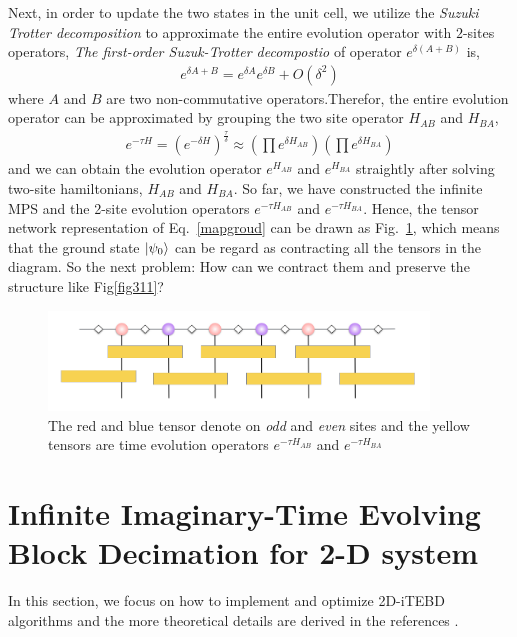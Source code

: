 Next, in order to update the two states in the unit cell, we utilize the \textit{Suzuki Trotter decomposition} to approximate the entire evolution operator with $2$-sites operators, \textit{The first-order Suzuk-Trotter decompostio} of operator $e^{\delta (A+B)}$ is,
\begin{align}
	\label{STd}
	e^{\delta A + B} = e^{\delta A}e^{\delta B} + O(\delta^2)
\end{align}
where $A$ and $B$ are two non-commutative operators.Therefor, the entire evolution operator can be approximated by grouping the two site operator $H_{AB}$ and $H_{BA}$,
\begin{align}
	\label{evoopt}
	e^{-\tau H} = \left(e^{-\delta H}\right)^{\frac{\tau}{\delta}} \approx \left(\prod e^{\delta H_{AB}} \right)\left( \prod e^{\delta H_{BA}}\right)
\end{align}
and we can obtain the evolution operator $e^{H_{AB}}$ and $e^{H_{BA}}$ straightly after solving two-site hamiltonians, $H_{AB}$ and $H_{BA}$.
So far, we have constructed the infinite MPS and the 2-site evolution operators $e^{-\tau H_{AB}}$ and $e^{-\tau H_{BA}}$. Hence, the tensor network representation of Eq.~\ref{mapgroud} can be drawn as Fig.~\ref{fig313}, which means that the ground state $\Ket{\psi_0}$ can be regard as contracting all the tensors in the diagram. So the next problem: How can we contract them and preserve the structure like Fig{\ref{fig311}}?

\begin{figure}[ht]
	\centering
	\includegraphics[width=0.90\textwidth]{figures/fig312.png}
	\caption[The tensor diagram of imaginary time evolving block decimation.]{The red and blue tensor denote on \textit{odd} and \textit{even} sites and the yellow tensors are time evolution operators $e^{-\tau H_{AB}}$ and $e^{-\tau H_{BA}}$}
	\label{fig313}
\end{figure}
\section{Infinite Imaginary-Time Evolving Block Decimation for 2-D system}

In this section, we focus on how to implement and optimize 2D-iTEBD algorithms and the more theoretical details are derived in the references \cite{PhysRevLett.99.220405} \cite{PhysRevLett.101.090603} \cite{PhysRevB.78.155117}.
\label{itebd}
